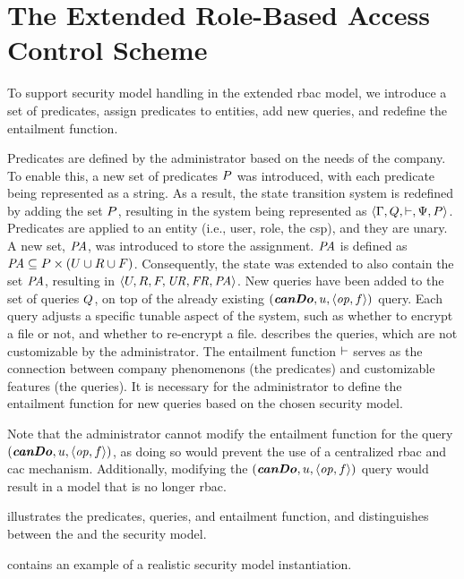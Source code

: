 \section{The Extended Role-Based Access Control Scheme}
\label{sec:hybrid.scheme}

To support security model handling in the extended \gls{rbac} model, we introduce a set of predicates, assign predicates to entities, add new queries, and redefine the entailment function. 

Predicates are defined by the administrator based on the needs of the company. To enable this, a new set of predicates \( P \) was introduced, with each predicate being represented as a string. As a result, the state transition system is redefined by adding the set \( P \), resulting in the system being represented as \( \langle \Gamma, Q, \vdash, \Psi, P \rangle \). Predicates are applied to an entity (i.e., user, role, the \gls{csp}), and they are unary. A new set, \( \mathit{PA} \), was introduced to store the assignment. \( \mathit{PA} \) is defined as \( \mathit{PA} \subseteq P \times (U \cup R \cup F) \). Consequently, the state was extended to also contain the set \( \mathit{PA} \), resulting in \( \langle U, R, F, \mathit{UR}, \mathit{FR}, \mathit{PA} \rangle \). New queries have been added to the set of queries \( Q \), on top of the already existing \( ( \textbf{\textit{canDo}}, u, \langle \mathit{op}, f \rangle ) \) query. Each query adjusts a specific tunable aspect of the system, such as whether to encrypt a file or not, and whether to re-encrypt a file.  describes the queries, which are not customizable by the administrator. The entailment function \( \vdash \) serves as the connection between company phenomenons (the predicates) and customizable features (the queries). It is necessary for the administrator to define the entailment function for new queries based on the chosen security model. 

Note that the administrator cannot modify the entailment function for the query \( ( \textbf{\textit{canDo}}, u, \langle \mathit{op}, f \rangle ) \), as doing so would prevent the use of a centralized \gls{rbac} and \gls{cac} mechanism. Additionally, modifying the \( ( \textbf{\textit{canDo}}, u, \langle \mathit{op}, f \rangle ) \) query would result in a model that is no longer \gls{rbac}.

 illustrates the predicates, queries, and entailment function, and distinguishes between the \erbac and the security model.

 contains an example of a realistic security model instantiation.


